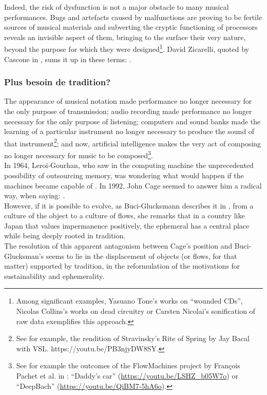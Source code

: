 Indeed, the risk of dysfunction is not a major obstacle to many musical performances. Bugs and artefacts caused by malfunctions are proving to be fertile sources of musical materials and subverting the cryptic functioning of processors reveals an invisible aspect of them, bringing to the surface their very nature, beyond the purpose for which they were designed\footnote{Among significant examples, Yasuano Tone's works on “wounded CDs”, Nicolas Collins's works on dead circuitry or Carsten Nicolai's sonification of raw data exemplifies this approach.}. David Zicarelli, quoted by Cascone in \cite{cascone_aesthetics_2000}, sums it up in these terms: .

\subsubsection{Plus besoin de tradition?}

The appearance of musical notation made performance no longer necessary for the only purpose of transmission; audio recording made performance no longer necessary for the only purpose of listening; computers and sound banks made the learning of a particular instrument no longer necessary to produce the sound of that instrument\footnote{See for example, the rendition of Stravinsky's Rite of Spring by Jay Bacal with VSL. https://youtu.be/PB3njyDW8SY.}; and now, artificial intelligence makes the very act of composing no longer necessary for music to be composed\footnote{See for example the outcomes of the FlowMachines project by François Pachet et al. in \cite{hadjeres_deepbach:_2016}: “Daddy's car” (\url{https://youtu.be/LSHZ_b05W7o}) or “DeepBach” (\url{https://youtu.be/QiBM7-5hA6o}).}.\\
\indent In 1964, Leroi-Gourhan, who saw in the computing machine the unprecedented possibility of outsourcing memory, was wondering what would happen if the machines became capable of  \cite{leroi-gourhan_geste_1964}. In 1992, John Cage seemed to answer him a radical way, when saying:  \cite{sebestik_ecoute_1992}. \\
\indent However, if it is possible to evolve, as Buci-Glucksmann describes it in \cite{buci-glucksmann_esthetique_2003}, from a culture of the object to a culture of flows, she remarks that in a country like Japan that values impermanence positively, the ephemeral has a central place while being deeply rooted in tradition.	\\
\indent The resolution of this apparent antagonism between Cage's position and Buci-Glucksman's seems to lie in the displacement of objects (or flows, for that matter) supported by tradition, in the reformulation of the motivations for sustainability and ephemerality.


